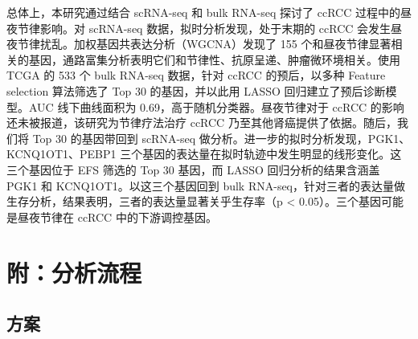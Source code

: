 \documentclass[
]{article}
\begin{document}
总体上，本研究通过结合 scRNA-seq 和 bulk RNA-seq 探讨了 ccRCC 过程中的昼夜节律影响。对 scRNA-seq 数据，拟时分析发现，处于末期的 ccRCC 会发生昼夜节律扰乱。加权基因共表达分析（WGCNA）发现了 155 个和昼夜节律显著相关的基因，通路富集分析表明它们和节律性、抗原呈递、肿瘤微环境相关。使用 TCGA 的 533 个 bulk RNA-seq 数据，针对 ccRCC 的预后，以多种 Feature selection 算法筛选了 Top 30 的基因，并以此用 LASSO 回归建立了预后诊断模型。AUC 线下曲线面积为 0.69，高于随机分类器。昼夜节律对于 ccRCC 的影响还未被报道，该研究为节律疗法治疗 ccRCC 乃至其他肾癌提供了依据。随后，我们将 Top 30 的基因带回到 scRNA-seq 做分析。进一步的拟时分析发现，PGK1、KCNQ1OT1、PEBP1 三个基因的表达量在拟时轨迹中发生明显的线形变化。这三个基因位于 EFS 筛选的 Top 30 基因，而 LASSO 回归分析的结果含涵盖 PGK1 和 KCNQ1OT1。以这三个基因回到 bulk RNA-seq，针对三者的表达量做生存分析，结果表明，三者的表达量显著关乎生存率（p \textless{} 0.05）。三个基因可能是昼夜节律在 ccRCC 中的下游调控基因。

\hypertarget{ux9644ux5206ux6790ux6d41ux7a0b}{%
\section{附：分析流程}\label{ux9644ux5206ux6790ux6d41ux7a0b}}

\hypertarget{ux65b9ux6848}{%
\subsection{方案}\label{ux65b9ux6848}}
\end{document}
